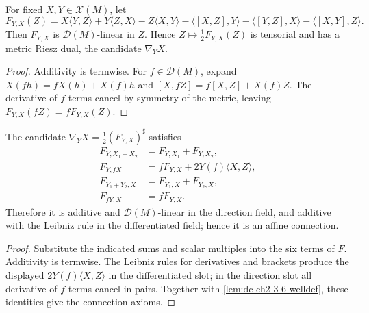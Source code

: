 \begin{lemma}
  \label{lem:dc-ch2-3-6-welldef}
  \leanok
  For fixed $X,Y\in\mathcal{X}(M)$, let
  \[
    F_{Y,X}(Z)
      =X\langle Y,Z\rangle+Y\langle Z,X\rangle-Z\langle X,Y\rangle
       -\langle[X,Z],Y\rangle-\langle[Y,Z],X\rangle
       -\langle[X,Y],Z\rangle.
  \]
  Then $F_{Y,X}$ is $\mathcal{D}(M)$-linear in $Z$. Hence
  $Z\mapsto\frac12F_{Y,X}(Z)$ is tensorial and has a metric Riesz dual, the
  candidate $\nabla_YX$.
\end{lemma}
\begin{proof}
  \leanok
  \sketch
  Additivity is termwise. For $f\in\mathcal{D}(M)$, expand
  $X(fh)=fX(h)+X(f)h$ and
  $[X,fZ]=f[X,Z]+X(f)Z$. The derivative-of-$f$ terms cancel by symmetry of the
  metric, leaving $F_{Y,X}(fZ)=fF_{Y,X}(Z)$.
\end{proof}

\begin{lemma}
  \label{lem:dc-ch2-3-6-affine}
  \leanok
  The candidate $\nabla_YX=\frac12(F_{Y,X})^\sharp$ satisfies
  \begin{align*}
    F_{Y,X_1+X_2}&=F_{Y,X_1}+F_{Y,X_2},\\
    F_{Y,fX}&=fF_{Y,X}+2Y(f)\langle X,Z\rangle,\\
    F_{Y_1+Y_2,X}&=F_{Y_1,X}+F_{Y_2,X},\\
    F_{fY,X}&=fF_{Y,X}.
  \end{align*}
  Therefore it is additive and $\mathcal{D}(M)$-linear in the direction field,
  and additive with the Leibniz rule in the differentiated field; hence it is an
  affine connection.
\end{lemma}
\begin{proof}
  \leanok
  \sketch
  Substitute the indicated sums and scalar multiples into the six terms of
  $F$. Additivity is termwise. The Leibniz rules for derivatives and brackets
  produce the displayed $2Y(f)\langle X,Z\rangle$ in the differentiated slot;
  in the direction slot all derivative-of-$f$ terms cancel in pairs. Together
  with \cref{lem:dc-ch2-3-6-welldef}, these identities give the connection
  axioms.
\end{proof}

